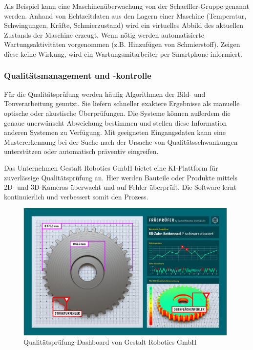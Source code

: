 \documentclass[a4paper,12pt, german]{report}
\begin{document}
Als Beispiel kann eine Maschinenüberwachung von der Schaeffler-Gruppe genannt werden. Anhand von Echtzeitdaten aus den Lagern einer Maschine (Temperatur, Schwingungen, Kräfte, Schmierzustand) wird ein virtuelles Abbild des aktuellen Zustands der Maschine erzeugt. Wenn nötig werden automatisierte Wartungsaktivitäten vorgenommen (z.B. Hinzufügen von Schmierstoff). Zeigen diese keine Wirkung, wird ein Wartungsmitarbeiter per Smartphone informiert.\cite{30}

\subsubsection{Qualitätsmanagement und -kontrolle}
Für die Qualitätsprüfung werden häufig Algorithmen der Bild- und Tonverarbeitung genutzt. Sie liefern schneller exaktere Ergebnisse als manuelle optische oder akustische Überprüfungen. Die Systeme können außerdem die genaue unerwünscht Abweichung bestimmen und stellen diese Information anderen Systemen zu Verfügung. Mit geeigneten Eingangsdaten kann eine Mustererkennung bei der Suche nach der Ursache von Qualitätsschwankungen unterstützen oder automatisch präventiv eingreifen.\cite{24}

Das Unternehmen Gestalt Robotics GmbH bietet eine KI-Plattform für zuverlässige Qualitätsprüfung an. Hier werden Bauteile oder Produkte mittels 2D- und 3D-Kameras überwacht und auf Fehler überprüft. Die Software lernt kontinuierlich und verbessert somit den Prozess.\cite{31}

\begin{figure}
  \center
 \includegraphics[width=11cm]{images/Gestalt Robotics.png}
  \caption[Qualitätsprüfung-Dashboard von Gestalt Robotics GmbH]{Qualitätsprüfung-Dashboard von Gestalt Robotics GmbH \cite{31}}
\end{figure}
\end{document}
